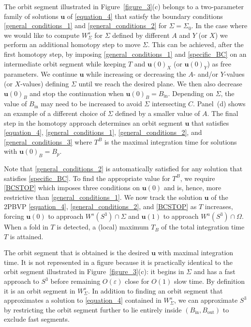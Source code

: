 \documentclass{ws-ijbc}
\begin{document}
The orbit segment illustrated in Figure~\ref{figure_3}(c) belongs to a two-parameter family of solutions $\mathbf{u}$ of \eqref{equation_4} that satisfy the boundary conditions \eqref{general_conditions_1} and \eqref{general_conditions_2} for $\Sigma=\Sigma_0$.  In the case where we would like to compute $W^{s}_{\Sigma}$ for $\Sigma$ defined by different $A$ and $Y$ (or $X$) we perform an additional homotopy step to move $\Sigma$.  This can be achieved, after the first homotopy step, by imposing \eqref{general_conditions_1} and \eqref{specific_BC} on an intermediate orbit segment while keeping $T$ and $\mathbf{u}(0)_X$ (or $\mathbf{u}(0)_Y$) as free parameters.  We continue $\mathbf{u}$ while increasing or decreasing the $A$- and/or $Y$-values (or $X$-values) defining $\Sigma$ until we reach the desired plane.  We then also decrease $\mathbf{u}(0)_B$ and stop the continuation when $\mathbf{u}(0)_B = B_{\text{in}}$.  Depending on $\Sigma$, the value of $B_{\text{in}}$ may need to be increased to avoid $\Sigma$ intersecting $C$.  Panel~(d) shows an example of a different choice of $\Sigma$ defined by a smaller value of $A$.  The final step in the homotopy approach determines an orbit segment $\mathbf{u}$ that satisfies \eqref{equation_4}, \eqref{general_conditions_1}, \eqref{general_conditions_2}, and \eqref{general_conditions_3} where $T^B$ is the maximal integration time for solutions with $\mathbf{u}(0)_B=B_p$.

Note that \eqref{general_conditions_2} is automatically satisfied for any solution that satisfies \eqref{specific_BC}.  To find the appropriate value for $T^B$, we require \eqref{BCSTOP} which imposes three conditions on $\mathbf{u}(0)$ and is, hence, more restrictive than \eqref{general_conditions_1}.  We now track the solution $\mathbf{u}$ of the 2PBVP \eqref{equation_4}, \eqref{general_conditions_2}, and \eqref{BCSTOP} as $T$ increases, forcing $\mathbf{u}(0)$ to approach $W^s(S^3)\cap\Sigma$ and $\mathbf{u}(1)$ to approach $W^u(S^3) \cap \Omega$. When a fold in $T$ is detected, a (local) maximum $T_B$ of the total integration time $T$ is attained.

The orbit segment that is obtained is the desired $\mathbf{u}$ with maximal integration time.  It is not represented in a figure because it is practically identical to the orbit segment illustrated in Figure~\ref{figure_3}(c): it begins in $\Sigma$ and has a fast approach to $S^3$ before remaining $O(\varepsilon)$ close for $O(1)$ slow time.  By definition it is an orbit segment in $W^{s}_{\Sigma}$.  In addition to finding an orbit segment that approximates a solution to \eqref{equation_4} contained in $W^s_{\Sigma}$, we can approximate $S^3$ by restricting the orbit segment further to lie entirely inside $(B_{\text{in}},B_{\text{out}})$ to exclude fast segments.
\end{document}
